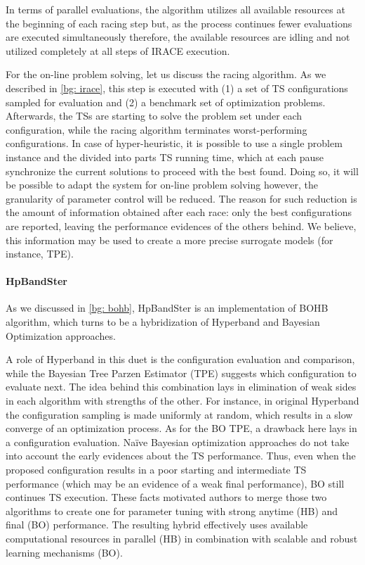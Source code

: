In terms of parallel evaluations, the algorithm utilizes all available resources at the beginning of each racing step but, as the process continues fewer evaluations are executed simultaneously therefore, the available resources are idling and not utilized completely at all steps of IRACE execution.

For the on-line problem solving, let us discuss the racing algorithm. As we described in \cref{bg: irace}, this step is executed with (1) a set of TS configurations sampled for evaluation and (2) a benchmark set of optimization problems. Afterwards, the TSs are starting to solve the problem set under each configuration, while the racing algorithm terminates worst-performing configurations. In case of hyper-heuristic, it is possible to use a single problem instance and the divided into parts TS running time, which at each pause synchronize the current solutions to proceed with the best found. Doing so, it will be possible to adapt the system for on-line problem solving however, the granularity of parameter control will be reduced. The reason for such reduction is the amount of information obtained after each race: only the best configurations are reported, leaving the performance evidences of the others behind. We believe, this information may be used to create a more precise surrogate models (for instance, TPE).

\paragraph{HpBandSter} As we discussed in \cref{bg: bohb}, HpBandSter is an implementation of BOHB algorithm, which turns to be a hybridization of Hyperband and Bayesian Optimization approaches.

A role of Hyperband in this duet is the configuration evaluation and comparison, while the Bayesian Tree Parzen Estimator (TPE) suggests which configuration to evaluate next. The idea behind this combination lays in elimination of weak sides in each algorithm with strengths of the other. For instance, in original Hyperband the configuration sampling is made uniformly at random, which results in a slow converge of an optimization process. As for the BO TPE, a drawback here lays in a configuration evaluation. Na\"ive Bayesian optimization approaches do not take into account the early evidences about the TS performance. Thus, even when the proposed configuration results in a poor starting and intermediate TS performance (which may be an evidence of a weak final performance), BO still continues TS execution. These facts motivated authors to merge those two algorithms to create one for parameter tuning with strong anytime (HB) and final (BO) performance. The resulting hybrid effectively uses available computational resources in parallel (HB) in combination with scalable and robust learning mechanisms (BO).

